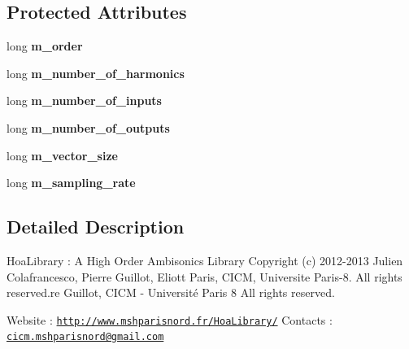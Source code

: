 \subsection*{Protected Attributes}
\begin{DoxyCompactItemize}
\item 
\hypertarget{class_ambisonic_a312690f0d1ba3191c0925a9d5f34cd17}{long {\bfseries m\-\_\-order}}\label{class_ambisonic_a312690f0d1ba3191c0925a9d5f34cd17}

\item 
\hypertarget{class_ambisonic_a91ff538ee47b2f6216f509d7756ea97e}{long {\bfseries m\-\_\-number\-\_\-of\-\_\-harmonics}}\label{class_ambisonic_a91ff538ee47b2f6216f509d7756ea97e}

\item 
\hypertarget{class_ambisonic_a6104162c4457f2d581a44b2e7007d188}{long {\bfseries m\-\_\-number\-\_\-of\-\_\-inputs}}\label{class_ambisonic_a6104162c4457f2d581a44b2e7007d188}

\item 
\hypertarget{class_ambisonic_a6875cb4a3b5e2b80982726df6c769106}{long {\bfseries m\-\_\-number\-\_\-of\-\_\-outputs}}\label{class_ambisonic_a6875cb4a3b5e2b80982726df6c769106}

\item 
\hypertarget{class_ambisonic_a6b10ff076a735555a373e9a83a2e4915}{long {\bfseries m\-\_\-vector\-\_\-size}}\label{class_ambisonic_a6b10ff076a735555a373e9a83a2e4915}

\item 
\hypertarget{class_ambisonic_ad3fb43ea3eb344de999500fbfc570af7}{long {\bfseries m\-\_\-sampling\-\_\-rate}}\label{class_ambisonic_ad3fb43ea3eb344de999500fbfc570af7}

\end{DoxyCompactItemize}


\subsection{Detailed Description}
Hoa\-Library \-: A High Order Ambisonics Library Copyright (c) 2012-\/2013 Julien Colafrancesco, Pierre Guillot, Eliott Paris, C\-I\-C\-M, Universite Paris-\/8. All rights reserved.\-re Guillot, C\-I\-C\-M -\/ Université Paris 8 All rights reserved.

Website \-: \href{http://www.mshparisnord.fr/HoaLibrary/}{\tt http\-://www.\-mshparisnord.\-fr/\-Hoa\-Library/} Contacts \-: \href{mailto:cicm.mshparisnord@gmail.com}{\tt cicm.\-mshparisnord@gmail.\-com}

